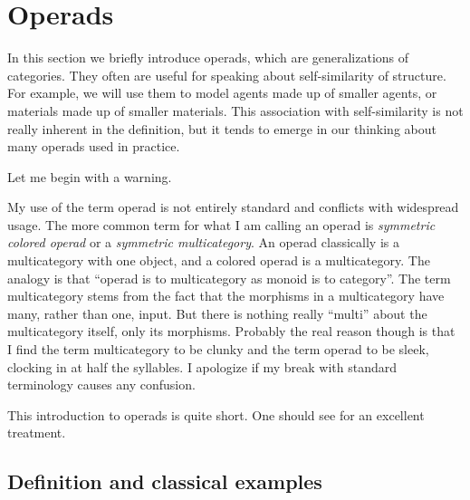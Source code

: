 

\section{Operads}\label{sec:operad}

In this section we briefly introduce operads, which are generalizations of categories. They often are useful for speaking about self-similarity of structure. For example, we will use them to model agents made up of smaller agents, or materials made up of smaller materials. This association with self-similarity is not really inherent in the definition, but it tends to emerge in our thinking about many operads used in practice. 

Let me begin with a warning.

\begin{warning}

My use of the term operad is not entirely standard and conflicts with widespread usage. The more common term for what I am calling an operad is {\em symmetric colored operad} or a {\em symmetric multicategory}. An operad classically is a multicategory with one object, and a colored operad is a multicategory. The analogy is that “operad is to multicategory as monoid is to category”. The term multicategory stems from the fact that the morphisms in a multicategory have many, rather than one, input. But there is nothing really “multi” about the multicategory itself, only its morphisms. Probably the real reason though is that I find the term multicategory to be clunky and the term operad to be sleek, clocking in at half the syllables. I apologize if my break with standard terminology causes any confusion.  

\end{warning}

This introduction to operads is quite short. One should see \cite{Le1} for an excellent treatment.


\subsection{Definition and classical examples}

